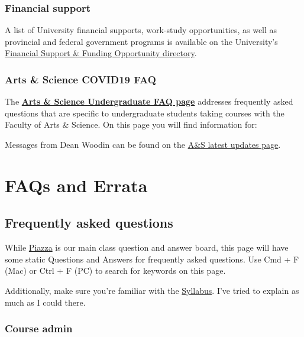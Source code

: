 \documentclass[
  openany]{book}
\begin{document}
\hypertarget{financial-support}{%
\subsection{Financial support}\label{financial-support}}

A list of University financial supports, work-study opportunities, as well as provincial and federal government programs is available on the University's \href{https://www.viceprovoststudents.utoronto.ca/covid-19/funding-opportunity-directory/}{Financial Support \& Funding Opportunity directory}.

\hypertarget{arts-science-covid19-faq}{%
\subsection{Arts \& Science COVID19 FAQ}\label{arts-science-covid19-faq}}

The \href{https://www.artsci.utoronto.ca/covid19-artsci-student-faqs}{\textbf{Arts \& Science Undergraduate FAQ page}} addresses frequently asked questions that are specific to undergraduate students taking courses with the Faculty of Arts \& Science. On this page you will find information for:

Messages from Dean Woodin can be found on the \href{https://www.artsci.utoronto.ca/news/covid-19-and-u-ts-response-latest-updates-and-faqs}{A\&S latest updates page}.

\hypertarget{faqs-and-errata}{%
\chapter{FAQs and Errata}\label{faqs-and-errata}}

\hypertarget{frequently-asked-questions}{%
\section{Frequently asked questions}\label{frequently-asked-questions}}

While \href{\%60r\%20\%60piazza\%60}{Piazza} is our main class question and answer board, this page will have some static Questions and Answers for frequently asked questions. Use Cmd + F (Mac) or Ctrl + F (PC) to search for keywords on this page.

Additionally, make sure you're familiar with the \protect\hyperlink{syllabus}{Syllabus}. I've tried to explain as much as I could there.

\hypertarget{course-admin}{%
\subsection{Course admin}\label{course-admin}}
\end{document}
